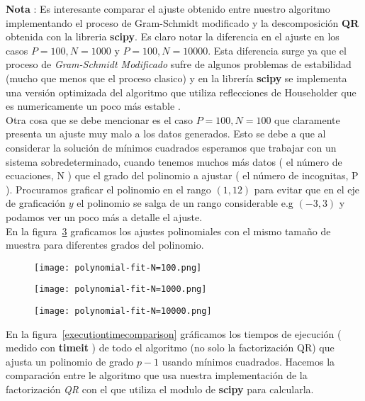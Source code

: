 \documentclass[12pt,letterpaper]{article}
\begin{document}
\textbf{Nota} : Es interesante comparar el ajuste obtenido entre nuestro algoritmo implementando el proceso de Gram-Schmidt modificado y la descomposici\'on \textbf{QR} obtenida con la libreria \textbf{scipy}. Es claro notar la diferencia en el ajuste en los casos $P=100, N=1000$ y $P=100, N=10000$. Esta diferencia surge ya que el proceso de \textit{Gram-Schmidt Modificado} sufre de algunos problemas de estabilidad (mucho que menos que el proceso clasico) y en la librer\'ia \textbf{scipy} se implementa una versi\'on optimizada del algoritmo que utiliza reflecciones de Householder \cite{scipy} que es numericamente un poco m\'as estable \cite{wikipediapage}. \\

Otra cosa que se debe mencionar es el caso $P=100, N=100$ que claramente presenta un ajuste muy malo a los datos generados. Esto se debe a que al considerar la soluci\'on de m\'inimos cuadrados esperamos que trabajar con un sistema sobredeterminado, cuando tenemos muchos m\'as datos ( el n\'umero de ecuaciones, N ) que el grado del polinomio a ajustar ( el n\'umero de incognitas, P ). Procuramos graficar el polinomio en el rango $(1, 12)$ para evitar que en el eje de graficaci\'on $y$ el polinomio se salga de un rango considerable e.g $(-3,3)$ y podamos ver un poco m\'as a detalle el ajuste. \\

En la figura~\ref{fig:polinomialFitN=10000} graficamos los ajustes polinomiales con el mismo tama\~no de muestra para diferentes grados del polinomio.

\begin{figure}[!h]
\centering
\texttt{[image: polynomial-fit-N=100.png]}
\label{fig:polinomialFitN=100}
\end{figure}

\begin{figure}[!h]
\centering
\texttt{[image: polynomial-fit-N=1000.png]}
\label{fig:polinomialFitN=1000}
\end{figure}

\begin{figure}[!h]
\centering
\texttt{[image: polynomial-fit-N=10000.png]}
\caption{}
\label{fig:polinomialFitN=10000}
\end{figure}

En la figura~\ref{executiontimecomparison} gr\'aficamos los tiempos de ejecuci\'on ( medido con \textbf{timeit} ) de todo el algoritmo (no solo la factorizaci\'on QR) que ajusta un polinomio de grado $p - 1$  usando m\'inimos cuadrados. Hacemos la comparaci\'on entre le algoritmo que usa nuestra implementaci\'on de la factorizaci\'on \textit{QR} con el que utiliza el modulo de \textbf{scipy} para calcularla.
\end{document}
